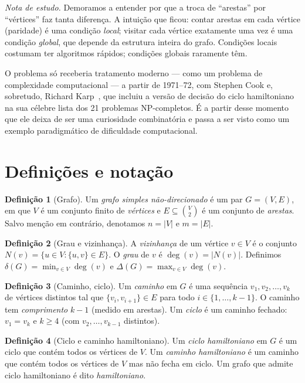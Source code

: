\documentclass[11pt,a4paper]{article}
\theoremstyle{definition}
\newtheorem{defn}{Definição}[section]
\newcommand{\nota}[1]{%
  \par\medskip
  {\small\color{notagray}\textit{Nota de estudo.} #1}\par\medskip
}
\begin{document}
\nota{Demoramos a entender por que a troca de ``arestas'' por ``vértices'' faz tanta diferença. A intuição que ficou: contar arestas em cada vértice (paridade) é uma condição \emph{local}; visitar cada vértice exatamente uma vez é uma condição \emph{global}, que depende da estrutura inteira do grafo. Condições locais costumam ter algoritmos rápidos; condições globais raramente têm.}

O problema só receberia tratamento moderno --- como um problema de complexidade computacional --- a partir de 1971--72, com Stephen Cook e, sobretudo, Richard Karp~\citep{karp1972}, que incluiu a versão de decisão do ciclo hamiltoniano na sua célebre lista dos 21 problemas NP-completos. É a partir desse momento que ele deixa de ser uma curiosidade combinatória e passa a ser visto como um exemplo paradigmático de dificuldade computacional.

\section{Definições e notação}

\begin{defn}[Grafo]
Um \emph{grafo simples não-direcionado} é um par $G = (V, E)$, em que $V$ é um conjunto finito de \emph{vértices} e $E \subseteq \binom{V}{2}$ é um conjunto de \emph{arestas}. Salvo menção em contrário, denotamos $n = |V|$ e $m = |E|$.
\end{defn}

\begin{defn}[Grau e vizinhança]
A \emph{vizinhança} de um vértice $v \in V$ é o conjunto $N(v) = \{u \in V : \{u,v\} \in E\}$. O \emph{grau} de $v$ é $\deg(v) = |N(v)|$. Definimos $\delta(G) = \min_{v \in V} \deg(v)$ e $\Delta(G) = \max_{v \in V} \deg(v)$.
\end{defn}

\begin{defn}[Caminho, ciclo]
Um \emph{caminho} em $G$ é uma sequência $v_1, v_2, \ldots, v_k$ de vértices distintos tal que $\{v_i, v_{i+1}\} \in E$ para todo $i \in \{1, \ldots, k-1\}$. O caminho tem \emph{comprimento} $k - 1$ (medido em arestas). Um \emph{ciclo} é um caminho fechado: $v_1 = v_k$ e $k \geq 4$ (com $v_2, \ldots, v_{k-1}$ distintos).
\end{defn}

\begin{defn}[Ciclo e caminho hamiltoniano]
Um \emph{ciclo hamiltoniano} em $G$ é um ciclo que contém todos os vértices de $V$. Um \emph{caminho hamiltoniano} é um caminho que contém todos os vértices de $V$ mas não fecha em ciclo. Um grafo que admite ciclo hamiltoniano é dito \emph{hamiltoniano}.
\end{defn}
\end{document}
